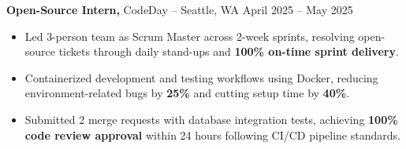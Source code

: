 \documentclass[11pt]{article}
\begin{document}
\textbf{Open-Source Intern,} {CodeDay} -- Seattle, WA \hfill April 2025 -- May 2025
\vspace{-9pt}
\begin{itemize}
  \item Led 3-person team as Scrum Master across 2-week sprints, resolving open-source tickets through daily stand-ups and \textbf{100\% on-time sprint delivery}.
  \item Containerized development and testing workflows using Docker, reducing environment-related bugs by \textbf{25\%} and cutting setup time by \textbf{40\%}.
  \item Submitted 2 merge requests with database integration tests, achieving \textbf{100\% code review approval} within 24 hours following CI/CD pipeline standards.
\end{itemize}

\end{document}
